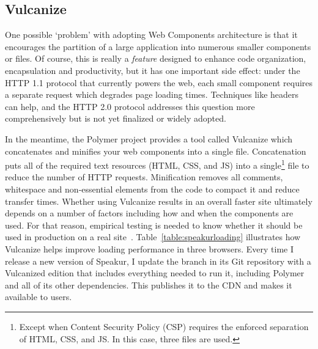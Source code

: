 \subsection{Vulcanize}
One possible `problem' with adopting Web Components architecture is that it encourages the partition of a large application into numerous smaller components or files.
Of course, this is really a \textit{feature} designed to enhance code organization, encapsulation and productivity, 
but it has one important side effect: 
under the HTTP 1.1 protocol that currently powers the web, each small component requires a separate request which degrades page loading times.
Techniques like  headers can help, and the HTTP 2.0 protocol addresses this question more comprehensively but is not yet finalized or widely adopted.

In the meantime, the Polymer project provides a tool called Vulcanize which concatenates and minifies your web components into a single file.
Concatenation puts all of the required text resources (HTML, CSS, and JS) into a 
single\footnote{Except when Content Security Policy (CSP) requires the enforced separation of HTML, CSS, and JS. In this case, three files are used.}
file to reduce the number of HTTP requests.
Minification removes all comments, whitespace and non-essential elements from the code to compact it and reduce transfer times.
Whether using Vulcanize results in an overall faster site ultimately depends on a number of factors including how and when the components are used.
For that reason, empirical testing is needed to know whether it should be used in production on a real site~\cite{polymercontributors2015-a}.
Table~\ref{table:speakurloading} illustrates how Vulcanize helps improve loading performance in three browsers.
Every time I release a new version of Speakur, I update the  branch in its Git repository with a Vulcanized edition that includes everything needed to run it, including Polymer and all of its other dependencies.
This publishes it to the  CDN and makes it available to users.

